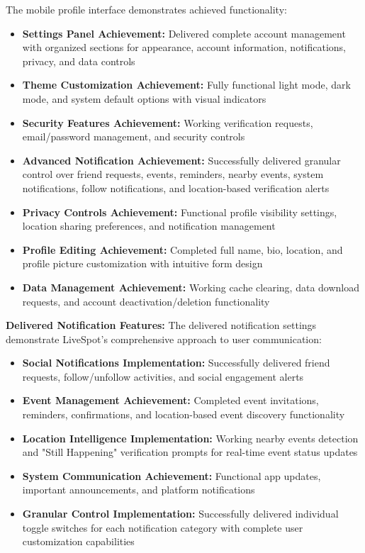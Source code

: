 The mobile profile interface demonstrates achieved functionality:
\begin{itemize}
    \item \textbf{Settings Panel Achievement:} Delivered complete account management with organized sections for appearance, account information, notifications, privacy, and data controls
    \item \textbf{Theme Customization Achievement:} Fully functional light mode, dark mode, and system default options with visual indicators
    \item \textbf{Security Features Achievement:} Working verification requests, email/password management, and security controls
    \item \textbf{Advanced Notification Achievement:} Successfully delivered granular control over friend requests, events, reminders, nearby events, system notifications, follow notifications, and location-based verification alerts
    \item \textbf{Privacy Controls Achievement:} Functional profile visibility settings, location sharing preferences, and notification management
    \item \textbf{Profile Editing Achievement:} Completed full name, bio, location, and profile picture customization with intuitive form design
    \item \textbf{Data Management Achievement:} Working cache clearing, data download requests, and account deactivation/deletion functionality
\end{itemize}

\textbf{Delivered Notification Features:}
The delivered notification settings demonstrate LiveSpot's comprehensive approach to user communication:
\begin{itemize}
    \item \textbf{Social Notifications Implementation:} Successfully delivered friend requests, follow/unfollow activities, and social engagement alerts
    \item \textbf{Event Management Achievement:} Completed event invitations, reminders, confirmations, and location-based event discovery functionality
    \item \textbf{Location Intelligence Implementation:} Working nearby events detection and "Still Happening" verification prompts for real-time event status updates
    \item \textbf{System Communication Achievement:} Functional app updates, important announcements, and platform notifications
    \item \textbf{Granular Control Implementation:} Successfully delivered individual toggle switches for each notification category with complete user customization capabilities
\end{itemize}
\clearpage

